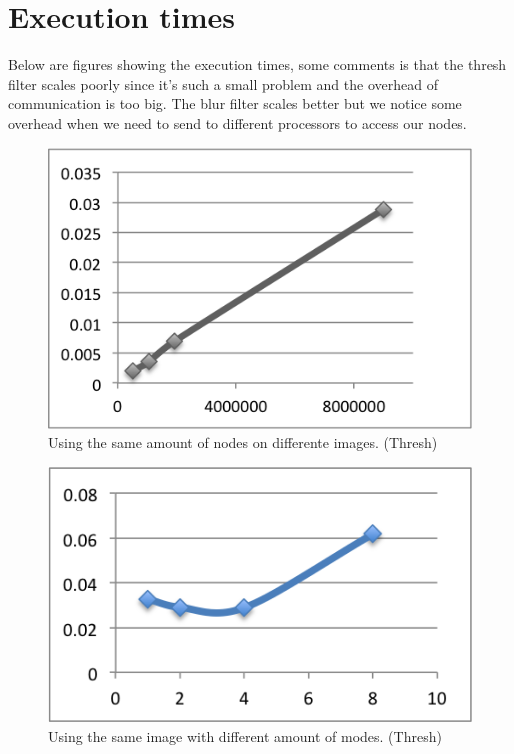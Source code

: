 \documentclass[a4paper]{article}
\begin{document}
\section{Execution times}
Below are figures showing the execution times, some comments is that the thresh filter scales poorly since it\rq{}s such a small problem and the overhead of communication is too big. The blur filter scales better but we notice some overhead when we need to send to different processors to access our nodes.
\begin{figure}
  \centering
  \includegraphics{sameProcessors.png}
  \caption{Using the same amount of nodes on differente images. (Thresh)}
  \label{tab:fig1}
\end{figure}
  
\begin{figure}
  \centering
  \includegraphics{samePixels.png}
  \caption{Using the same image with different amount of modes. (Thresh)}
  \label{tab:fig2}
\end{figure}
\end{document}
